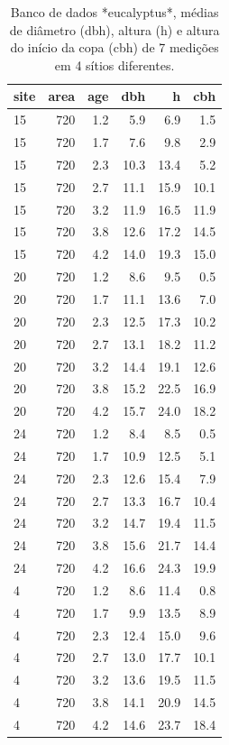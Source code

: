 \documentclass[article]{jss}
\begin{document}
\begin{CodeChunk}
\begin{table}

\caption{\label{tab:euc_medias}Banco de dados *eucalyptus*, médias de diâmetro (dbh), altura (h) e altura do início da copa (cbh) de 7 medições em 4 sítios diferentes.}
\centering
\begin{tabular}[t]{l|r|r|r|r|r}
\hline
site & area & age & dbh & h & cbh\\
\hline
15 & 720 & 1.2 & 5.9 & 6.9 & 1.5\\
\hline
15 & 720 & 1.7 & 7.6 & 9.8 & 2.9\\
\hline
15 & 720 & 2.3 & 10.3 & 13.4 & 5.2\\
\hline
15 & 720 & 2.7 & 11.1 & 15.9 & 10.1\\
\hline
15 & 720 & 3.2 & 11.9 & 16.5 & 11.9\\
\hline
15 & 720 & 3.8 & 12.6 & 17.2 & 14.5\\
\hline
15 & 720 & 4.2 & 14.0 & 19.3 & 15.0\\
\hline
20 & 720 & 1.2 & 8.6 & 9.5 & 0.5\\
\hline
20 & 720 & 1.7 & 11.1 & 13.6 & 7.0\\
\hline
20 & 720 & 2.3 & 12.5 & 17.3 & 10.2\\
\hline
20 & 720 & 2.7 & 13.1 & 18.2 & 11.2\\
\hline
20 & 720 & 3.2 & 14.4 & 19.1 & 12.6\\
\hline
20 & 720 & 3.8 & 15.2 & 22.5 & 16.9\\
\hline
20 & 720 & 4.2 & 15.7 & 24.0 & 18.2\\
\hline
24 & 720 & 1.2 & 8.4 & 8.5 & 0.5\\
\hline
24 & 720 & 1.7 & 10.9 & 12.5 & 5.1\\
\hline
24 & 720 & 2.3 & 12.6 & 15.4 & 7.9\\
\hline
24 & 720 & 2.7 & 13.3 & 16.7 & 10.4\\
\hline
24 & 720 & 3.2 & 14.7 & 19.4 & 11.5\\
\hline
24 & 720 & 3.8 & 15.6 & 21.7 & 14.4\\
\hline
24 & 720 & 4.2 & 16.6 & 24.3 & 19.9\\
\hline
4 & 720 & 1.2 & 8.6 & 11.4 & 0.8\\
\hline
4 & 720 & 1.7 & 9.9 & 13.5 & 8.9\\
\hline
4 & 720 & 2.3 & 12.4 & 15.0 & 9.6\\
\hline
4 & 720 & 2.7 & 13.0 & 17.7 & 10.1\\
\hline
4 & 720 & 3.2 & 13.6 & 19.5 & 11.5\\
\hline
4 & 720 & 3.8 & 14.1 & 20.9 & 14.5\\
\hline
4 & 720 & 4.2 & 14.6 & 23.7 & 18.4\\
\hline
\end{tabular}
\end{table}

\end{CodeChunk}
\end{document}
